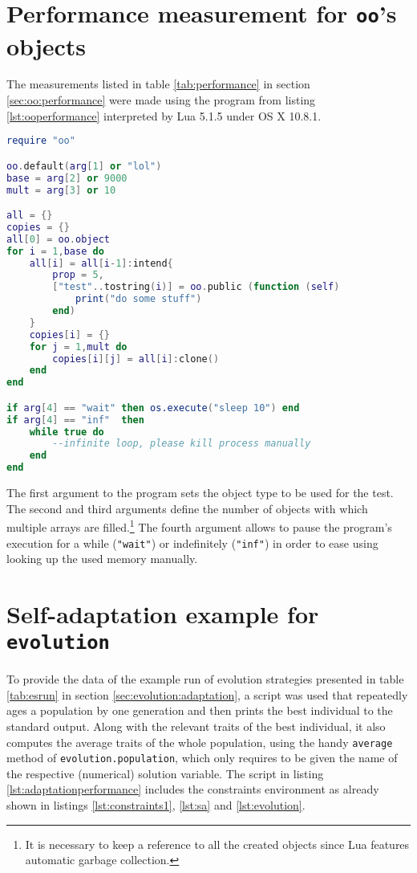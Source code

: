 \begin{appendices}
\section{Performance measurement for \texttt{oo}'s objects}
\label{sec:app:ooperformance}

The measurements listed in table \ref{tab:performance} in section \ref{sec:oo:performance} were made using the program from listing \ref{lst:ooperformance} interpreted by Lua 5.1.5 under OS X 10.8.1. 

\begin{lstlisting}[language=lua, caption={Test program for memory measurement of different object types}, label=lst:ooperformance, name=lst:ooperformance]
require "oo"

oo.default(arg[1] or "lol")
base = arg[2] or 9000
mult = arg[3] or 10

all = {}
copies = {}
all[0] = oo.object
for i = 1,base do
	all[i] = all[i-1]:intend{
		prop = 5,
		["test"..tostring(i)] = oo.public (function (self)
			print("do some stuff")
		end)
	}
	copies[i] = {}
	for j = 1,mult do
		copies[i][j] = all[i]:clone()
	end
end

if arg[4] == "wait" then os.execute("sleep 10") end
if arg[4] == "inf"  then
	while true do
		--infinite loop, please kill process manually
	end
end
\end{lstlisting}
	
The first argument to the program sets the object type to be used for the test. The second and third arguments define the number of objects with which multiple arrays are filled.\footnote{It is necessary to keep a reference to all the created objects since Lua features automatic garbage collection.} The fourth argument allows to pause the program's execution for a while (\texttt{"wait"}) or indefinitely (\texttt{"inf"}) in order to ease using looking up the used memory manually.

\section{Self-adaptation example for \texttt{evolution}}
\label{sec:app:adaptation}

To provide the data of the example run of evolution strategies presented in table \ref{tab:esrun} in section \ref{sec:evolution:adaptation}, a script was used that repeatedly ages a population by one generation and then prints the best individual to the standard output. Along with the relevant traits of the best individual, it also computes the average traits of the whole population, using the handy \texttt{average} method of \texttt{evolution.population}, which only requires to be given the name of the respective (numerical) solution variable. The script in listing \ref{lst:adaptationperformance} includes the constraints environment as already shown in listings \ref{lst:constraints1}, \ref{lst:sa} and \ref{lst:evolution}.


\end{appendices}
